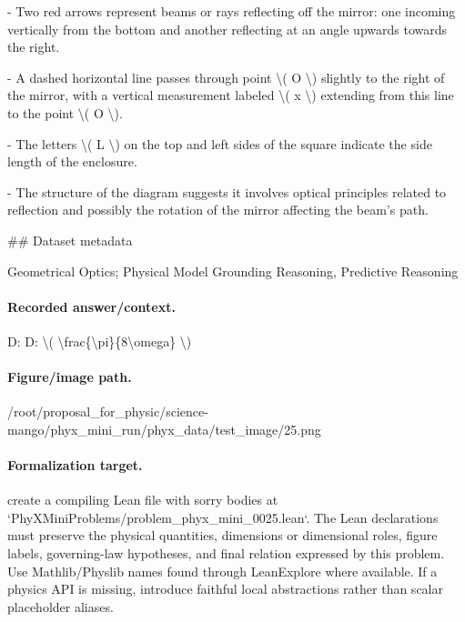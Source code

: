 - Two red arrows represent beams or rays reflecting off the mirror: one incoming vertically from the bottom and another reflecting at an angle upwards towards the right. 

- A dashed horizontal line passes through point \textbackslash{}( O \textbackslash{}) slightly to the right of the mirror, with a vertical measurement labeled \textbackslash{}( x \textbackslash{}) extending from this line to the point \textbackslash{}( O \textbackslash{}).

- The letters \textbackslash{}( L \textbackslash{}) on the top and left sides of the square indicate the side length of the enclosure.

- The structure of the diagram suggests it involves optical principles related to reflection and possibly the rotation of the mirror affecting the beam's path.

\#\# Dataset metadata

Geometrical Optics; Physical Model Grounding Reasoning, Predictive Reasoning

\paragraph{Recorded answer/context.}
D: D: \textbackslash{}( \textbackslash{}frac\{\textbackslash{}pi\}\{8\textbackslash{}omega\} \textbackslash{})

\paragraph{Figure/image path.}
/root/proposal\_for\_physic/science-mango/phyx\_mini\_run/phyx\_data/test\_image/25.png

\paragraph{Formalization target.}
create a compiling Lean file with sorry bodies at `PhyXMiniProblems/problem\_phyx\_mini\_0025.lean`. The Lean declarations must preserve the physical quantities, dimensions or dimensional roles, figure labels, governing-law hypotheses, and final relation expressed by this problem.
Use Mathlib/Physlib names found through LeanExplore where available. If a physics API is missing, introduce faithful local abstractions rather than scalar placeholder aliases.

